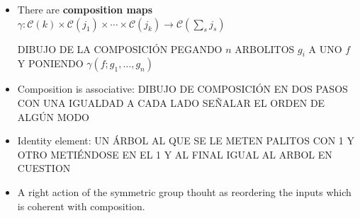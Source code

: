 \documentclass{beamer}
\theoremstyle{definition}
\newcommand{\CC}{\mathcal{C}}
\begin{document}
\begin{frame}
	\begin{itemize}
		\item There are \textbf{composition maps} $\gamma : \CC(k) \times \CC(j_1) \times \cdots \times \CC(j_k) \to \CC(\sum_s j_s)$
		
		DIBUJO DE LA COMPOSICIÓN PEGANDO $n$ ARBOLITOS  $g_i$ A UNO $f$ Y PONIENDO $\gamma(f;g_1,\dots, g_n)$
	\end{itemize}
\end{frame}

\begin{frame}
	\begin{itemize}
		\item Composition is associative: DIBUJO DE COMPOSICIÓN EN DOS PASOS CON UNA IGUALDAD A CADA LADO SEÑALAR EL ORDEN DE ALGÚN MODO
	\end{itemize}
\end{frame}

\begin{frame}
	\begin{itemize}
		\item<1-> Identity element: UN ÁRBOL AL QUE SE LE METEN PALITOS CON 1 Y OTRO METIÉNDOSE EN EL 1 Y AL FINAL IGUAL AL ARBOL EN CUESTION 
		\item<2-> A right action of the symmetric group thouht as reordering the inputs which is coherent with composition.
	\end{itemize}
\end{frame}
\end{document}
